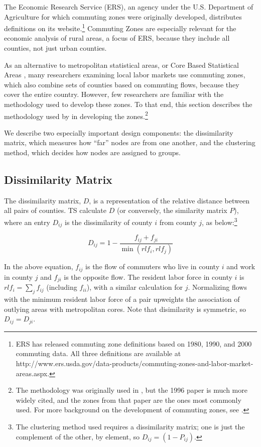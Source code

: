 The Economic Research Service (ERS), an agency under the U.S. Department of Agriculture for which commuting zones were originally developed, distributes definitions on its website.\footnote{ERS has released commuting zone definitions based on 1980, 1990, and 2000 commuting data. All three definitions are available at http://www.ers.usda.gov/data-products/commuting-zones-and-labor-market-areas.aspx.} Commuting Zones are especially relevant for the economic analysis of rural areas, a focus of ERS, because they include all counties, not just urban counties.

As an alternative to metropolitan statistical areas, or Core Based Statistical Areas \citep{OMB2013}, many researchers examining local labor markets use commuting zones, which also combine sets of counties based on commuting flows, because they cover the entire country. However, few researchers are familiar with the methodology used to develop these zones. To that end, this section describes the methodology used by \cite{TS1996} in developing the zones.\footnote{The methodology was originally used in \cite{TK1987}, but the 1996 paper is much more
widely cited, and the zones from that paper are the ones most commonly used. For more background on the development of commuting zones, see \cite{FowlerRhubartJensen2016}.}

We describe two especially important design components: the dissimilarity matrix, which measures how ``far'' nodes are from one another, and the clustering method, which decides how nodes are assigned to groups.

\subsection{Dissimilarity Matrix}

The dissimilarity matrix, $D$, is a representation of the relative distance between all pairs of counties. TS calculate $D$ (or conversely, the similarity matrix $P$), where an entry $D_{ij}$ is the dissimilarity of county $i$ from county $j$, as below:\footnote{The clustering method used requires a dissimilarity matrix; one is just the complement of the other, by element, so $D_{ij}=(1-P_{ij})$.}

\begin{equation}\label{eqn:diss}
D_{ij} = 1- \frac{f_{ij}+f_{ji}}{\min(rlf_{i},rlf_j)}
\end{equation}

In the above equation, $f_{ij}$ is the flow of commuters who live in county $i$ and work in county $j$ and $f_{ji}$ is the opposite flow. The resident labor force in county $i$ is $rlf_i = \sum_j f_{ij}$ (including $f_{ii}$), with a similar calculation for $j$. Normalizing flows with the minimum resident labor force of a pair upweights the association of outlying areas with metropolitan cores. Note that disimilarity is symmetric, so $D_{ij}=D_{ji}$.

